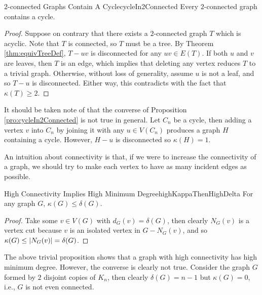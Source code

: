 \documentclass[math, code]{amznotes}
\theoremstyle{remark}
\begin{document}
\begin{probox}{$2$-connected Graphs Contain A Cycle}{cycleIn2Connected}
    Every $2$-connected graph contains a cycle.
    \tcblower
    \begin{proof}
        Suppose on contrary that there exists a $2$-connected graph $T$ which is acyclic. Note that $T$ is connected, so $T$ must be a tree. By Theorem \ref{thm:equivTreeDef}, $T - uv$ is disconnected for any $uv \in E(T)$. If both $u$ and $v$ are leaves, then $T$ is an edge, which implies that deleting any vertex reduces $T$ to a trivial graph. Otherwise, without loss of generality, assume $u$ is not a leaf, and so $T - u$ is disconnected. Either way, this contradicts with the fact that $\kappa(T) \geq 2$.
    \end{proof}
\end{probox}
It should be taken note of that the converse of Proposition \ref{pro:cycleIn2Connected} is not true in general. Let $C_n$ be a cycle, then adding a vertex $v$ into $C_n$ by joining it with any $u \in V(C_n)$ produces a graph $H$ containing a cycle. However, $H - u$ is disconnected so $\kappa(H) = 1$.

An intuition about connectivity is that, if we were to increase the connectivity of a graph, we should try to make each vertex to have as many incident edges as possible.
\begin{probox}{High Connectivity Implies High Minimum Degree}{highKappaThenHighDelta}
    For any graph $G$, $\kappa(G) \leq \delta(G)$.
    \tcblower
    \begin{proof}
        Take some $v \in V(G)$ with $d_G(v) = \delta(G)$, then clearly $N_G(v)$ is a vertex cut because $v$ is an isolated vertex in $G - N_G(v)$, and so $\kappa(G) \leq {\left\lvert {N_G(v)} \right\rvert} = \delta(G)$.
    \end{proof}
\end{probox}
The above trivial proposition shows that a graph with high connectivity has high minimum degree. However, the converse is clearly not true. Consider the graph $G$ formed by $2$ disjoint copies of $K_n$, then clearly $\delta(G) = n - 1$ but $\kappa(G) = 0$, i.e., $G$ is not even connected.
\end{document}
